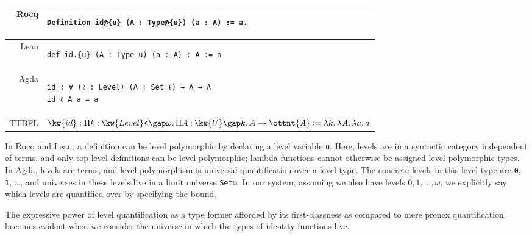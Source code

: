 \documentclass[a4paper,UKenglish,cleveref,autoref,thm-restate]{lipics-v2021}
\makeatletter
\newcommand{\lang}{TTBFL\@\xspace}
\makeatother
\begin{document}
\begin{table}[H]
\begin{tabular}{rp{}}
  Rocq &
  \begin{minipage}[t]{0.51\textwidth}
  \begin{verbatim}
Definition id@{u} (A : Type@{u}) (a : A) := a.
  \end{verbatim}
  \end{minipage}
  \\
  \midrule
  Lean &
  \begin{minipage}[t]{0.51\textwidth}
  \begin{verbatim}
def id.{u} (A : Type u) (a : A) : A := a
  \end{verbatim}
  \end{minipage}
  \\
  \midrule
  Agda &
  \begin{minipage}[t]{0.51\textwidth}
  \begin{verbatim}
id : ∀ (ℓ : Level) (A : Set ℓ) → A → A
id ℓ A a = a
  \end{verbatim}
  \end{minipage}
  \\
  \midrule
  \lang & $\kw{id} :   \Pi  k  \mathbin{:}   \kw{Level}\texttt{<} \gap   \omega    \mathpunct{.}   \Pi  A  \mathbin{:}   \kw{U} \gap  k   \mathpunct{.}  A    \to  \ottnt{A}  \coloneq  \lambda  k  \mathpunct{.}   \lambda  A  \mathpunct{.}   \lambda  a  \mathpunct{.}  a   $
\end{tabular}
\end{table}

In Rocq and Lean, a definition can be level polymorphic
by declaring a level variable \texttt{u}.
Here, levels are in a syntactic category independent of terms,
and only top-level definitions can be level polymorphic;
lambda functions cannot otherwise be assigned level-polymorphic types.
In Agda, levels are terms, and level polymorphism is universal quantification over a level type.
The concrete levels in this level type are \texttt{0}, \texttt{1}, \dots,
and universes in these levels live in a limit universe \texttt{Setω}.
In our system, assuming we also have levels $0, 1, \dots,  \omega $,
we explicitly say which levels are quantified over by specifying the bound.

The expressive power of level quantification as a type former
afforded by its first-classness as compared to mere prenex quantification
becomes evident when we consider the universe in which the types of identity functions live.
\end{document}
